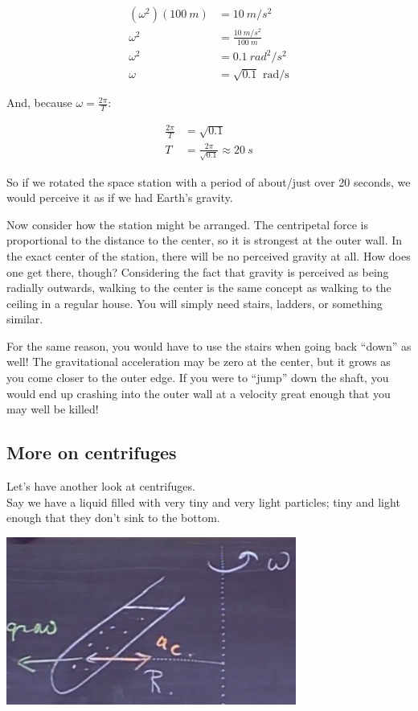 \documentclass[8.01x]{subfiles}
\begin{document}
\begin{align}
(\omega^2)(\SI{100}{m}) &= \SI{10}{m/s^2}\\
\omega^2 &= \frac{\SI{10}{m/s^2}}{\SI{100}{m}}\\
\omega^2 &= \SI{0.1}{rad^2/s^2}\\
\omega &= \sqrt{0.1} \text{ rad/s}
\end{align}

And, because $\omega = \frac{2 \pi}{T}$:

\begin{align}
\frac{2 \pi}{T} &= \sqrt{0.1}\\
T &= \frac{2 \pi}{\sqrt{0.1}} \approx \SI{20}{s}
\end{align}

So if we rotated the space station with a period of about/just over 20 seconds, we would perceive it as if we had Earth's gravity.

Now consider how the station might be arranged. The centripetal force is proportional to the distance to the center, so it is strongest at the outer wall. In the exact center of the station, there will be no perceived gravity at all. How does one get there, though? Considering the fact that gravity is perceived as being radially outwards, walking to the center is the same concept as walking to the ceiling in a regular house. You will simply need stairs, ladders, or something similar.

For the same reason, you would have to use the stairs when going back ``down'' as well! The gravitational acceleration may be zero at the center, but it grows as you come closer to the outer edge. If you were to ``jump'' down the shaft, you would end up crashing into the outer wall at a velocity great enough that you may well be killed!

\subsection{More on centrifuges}

Let's have another look at centrifuges.\\
Say we have a liquid filled with very tiny and very light particles; tiny and light enough that they don't sink to the bottom.

\begin{center}
\includegraphics[scale=0.6]{Graphics/lec5_centrifuge}
\end{center}
\end{document}
